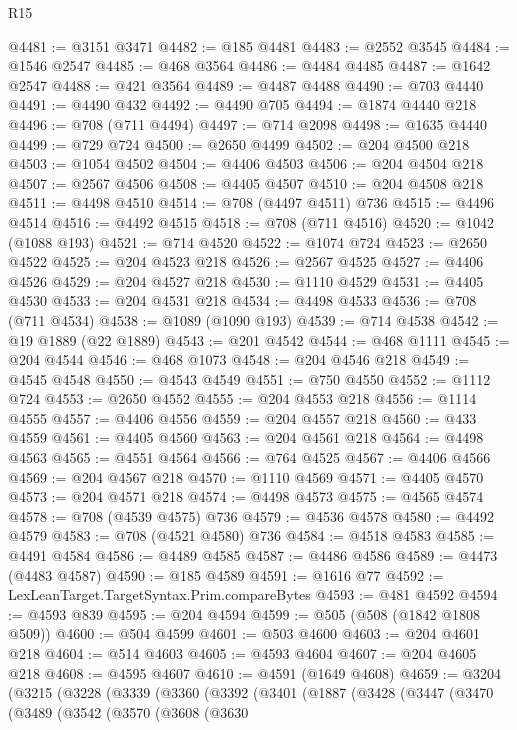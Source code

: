 \begin{lexlean}{R15}
\begin{coremodule}
{{{{{{{{{{{@4481 := @3151 @3471
@4482 := @185 @4481
@4483 := @2552 @3545
@4484 := @1546 @2547
@4485 := @468 @3564
@4486 := @4484 @4485
@4487 := @1642 @2547
@4488 := @421 @3564
@4489 := @4487 @4488
@4490 := @703 @4440
@4491 := @4490 @432
@4492 := @4490 @705
@4494 := @1874 @4440 @218
@4496 := @708 (@711 @4494)
@4497 := @714 @2098
@4498 := @1635 @4440
@4499 := @729 @724
@4500 := @2650 @4499
@4502 := @204 @4500 @218
@4503 := @1054 @4502
@4504 := @4406 @4503
@4506 := @204 @4504 @218
@4507 := @2567 @4506
@4508 := @4405 @4507
@4510 := @204 @4508 @218
@4511 := @4498 @4510
@4514 := @708 (@4497 @4511) @736
@4515 := @4496 @4514
@4516 := @4492 @4515
@4518 := @708 (@711 @4516)
@4520 := @1042 (@1088 @193)
@4521 := @714 @4520
@4522 := @1074 @724
@4523 := @2650 @4522
@4525 := @204 @4523 @218
@4526 := @2567 @4525
@4527 := @4406 @4526
@4529 := @204 @4527 @218
@4530 := @1110 @4529
@4531 := @4405 @4530
@4533 := @204 @4531 @218
@4534 := @4498 @4533
@4536 := @708 (@711 @4534)
@4538 := @1089 (@1090 @193)
@4539 := @714 @4538
@4542 := @19 @1889 (@22 @1889)
@4543 := @201 @4542
@4544 := @468 @1111
@4545 := @204 @4544
@4546 := @468 @1073
@4548 := @204 @4546 @218
@4549 := @4545 @4548
@4550 := @4543 @4549
@4551 := @750 @4550
@4552 := @1112 @724
@4553 := @2650 @4552
@4555 := @204 @4553 @218
@4556 := @1114 @4555
@4557 := @4406 @4556
@4559 := @204 @4557 @218
@4560 := @433 @4559
@4561 := @4405 @4560
@4563 := @204 @4561 @218
@4564 := @4498 @4563
@4565 := @4551 @4564
@4566 := @764 @4525
@4567 := @4406 @4566
@4569 := @204 @4567 @218
@4570 := @1110 @4569
@4571 := @4405 @4570
@4573 := @204 @4571 @218
@4574 := @4498 @4573
@4575 := @4565 @4574
@4578 := @708 (@4539 @4575) @736
@4579 := @4536 @4578
@4580 := @4492 @4579
@4583 := @708 (@4521 @4580) @736
@4584 := @4518 @4583
@4585 := @4491 @4584
@4586 := @4489 @4585
@4587 := @4486 @4586
@4589 := @4473 (@4483 @4587)
@4590 := @185 @4589
@4591 := @1616 @77
@4592 := LexLeanTarget.TargetSyntax.Prim.compareBytes
@4593 := @481 @4592
@4594 := @4593 @839
@4595 := @204 @4594
@4599 := @505 (@508 (@1842 @1808 @509))
@4600 := @504 @4599
@4601 := @503 @4600
@4603 := @204 @4601 @218
@4604 := @514 @4603
@4605 := @4593 @4604
@4607 := @204 @4605 @218
@4608 := @4595 @4607
@4610 := @4591 (@1649 @4608)
@4659 := @3204
    (@3215
      (@3228
        (@3339
          (@3360
            (@3392
              (@3401
                (@1887
                  (@3428
                    (@3447
                      (@3470
                        (@3489
                          (@3542
                            (@3570
                              (@3608
                                (@3630
}}}}}}}}}}}
\end{coremodule}
\end{lexlean}
